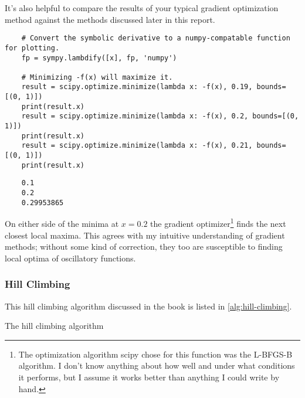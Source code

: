 \documentclass{article}
\begin{document}
It's also helpful to compare the results of your typical gradient optimization method against the
methods discussed later in this report.

\begin{verbatim}
    # Convert the symbolic derivative to a numpy-compatable function for plotting.
    fp = sympy.lambdify([x], fp, 'numpy')

    # Minimizing -f(x) will maximize it.
    result = scipy.optimize.minimize(lambda x: -f(x), 0.19, bounds=[(0, 1)])
    print(result.x)
    result = scipy.optimize.minimize(lambda x: -f(x), 0.2, bounds=[(0, 1)])
    print(result.x)
    result = scipy.optimize.minimize(lambda x: -f(x), 0.21, bounds=[(0, 1)])
    print(result.x)
\end{verbatim}
\vspace{-1cm}
\begin{verbatim}
    0.1
    0.2
    0.29953865
\end{verbatim}
\vspace{-1cm}

On either side of the minima at $x = 0.2$ the gradient optimizer\footnote{The optimization
    algorithm scipy chose for this function was the L-BFGS-B algorithm. I don't know anything about
    how well and under what conditions it performs, but I assume it works better than anything I
    could write by hand.} finds the next closest local maxima. This agrees with my intuitive
understanding of gradient methods; without some kind of correction, they too are susceptible to
finding local optima of oscillatory functions.

\subsubsection{Hill Climbing}

This hill climbing algorithm discussed in the book is listed in \autoref{alg:hill-climbing}.

\begin{algorithm}
    \begin{algorithmic}
                \EndIf{}
            \EndWhile{}
            \State{}
        \EndFunction{}
    \end{algorithmic}
    \caption{The hill climbing algorithm}\label{alg:hill-climbing}
\end{algorithm}
\end{document}
